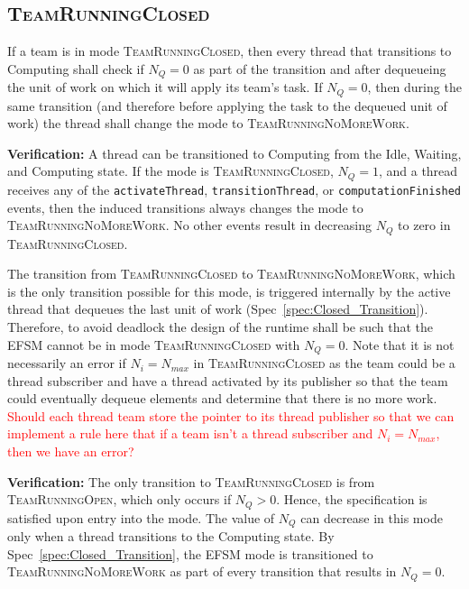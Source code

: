 \documentclass{article}
\newcommand{\TeamRunningOpen}   {\textsc{TeamRunningOpen}}
\newcommand{\TeamRunningClosed} {\textsc{TeamRunningClosed}}
\newcommand{\TeamRunningNoMoreWork} {\textsc{TeamRunningNoMoreWork}}
\begin{document}
\subsection{\TeamRunningClosed}
\begin{spec}
\label{spec:Closed_Transition}
If a team is in mode \TeamRunningClosed, then every thread that transitions to
Computing shall check if $N_Q = 0$ as part of the transition and after
dequeueing the unit of work on which it will apply its team's task.  If $N_Q =
0$, then during the same transition (and therefore before applying the task to
the dequeued unit of work) the thread shall change the mode to
\TeamRunningNoMoreWork.
\end{spec}
\textbf{Verification:}\hspace{0.125in}  A thread can be transitioned to
Computing from the Idle, Waiting, and Computing state.  If the mode is
{\TeamRunningClosed}, $N_Q = 1$, and a
thread receives any of the \texttt{activateThread}, \texttt{transitionThread},
or \texttt{computationFinished} events, then the induced transitions always changes
the mode to \TeamRunningNoMoreWork.  No other events result in decreasing $N_Q$
to zero in \TeamRunningClosed.

\begin{spec}
\label{spec:Closed_NoWork}
The transition from {\TeamRunningClosed} to \TeamRunningNoMoreWork, which is the
only transition possible for this mode, is triggered internally by the active
thread that dequeues the last unit of work (Spec~\ref{spec:Closed_Transition}).
Therefore, to avoid deadlock the design of the runtime shall be such that the
EFSM cannot be in mode {\TeamRunningClosed} with $N_Q = 0$.  Note that it is not
necessarily an error if $N_i = N_{max}$ in {\TeamRunningClosed} as the team
could be a thread subscriber and have a thread activated by its publisher so
that the team could eventually dequeue elements and determine that there is no
more work.
\textcolor{red}{Should each thread team store the pointer to its thread
publisher so that we can implement a rule here that if a team isn't a thread
subscriber and $N_i = N_{max}$, then we have an error?}
\end{spec}
\textbf{Verification:}\hspace{0.125in}  The only transition to
{\TeamRunningClosed} is from {\TeamRunningOpen}, which only occurs if $N_Q > 0$.
Hence, the specification is satisfied upon entry into the mode.  The value of
$N_Q$ can decrease in this mode only when a thread transitions to the Computing
state.   By Spec~\ref{spec:Closed_Transition}, the EFSM mode is transitioned to
{\TeamRunningNoMoreWork} as part of every transition that results in $N_Q = 0$.
\end{document}
